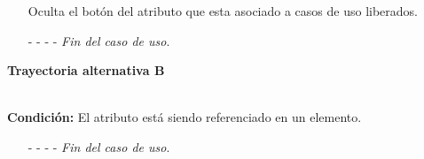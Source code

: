 \begin{enumerate}
	\UCpaso[\UCsist] Oculta el botón \eliminar del atributo que esta asociado a casos de uso liberados.
	\item[- -] - - {\em {Fin del caso de uso}}.
\end{enumerate}
	\hypertarget{CU7-1-3:TAB}{\textbf{Trayectoria alternativa B}}\\
	\noindent \textbf{Condición:} El atributo está siendo referenciado en un elemento.
	\begin{enumerate}
		\UCpaso[\UCsist] Muestra la pantalla  o  con el mensaje  mostrando una lista de elementos que están referenciando al atributo.
		\item[- -] - - {\em {Fin del caso de uso}}.%
	\end{enumerate}
